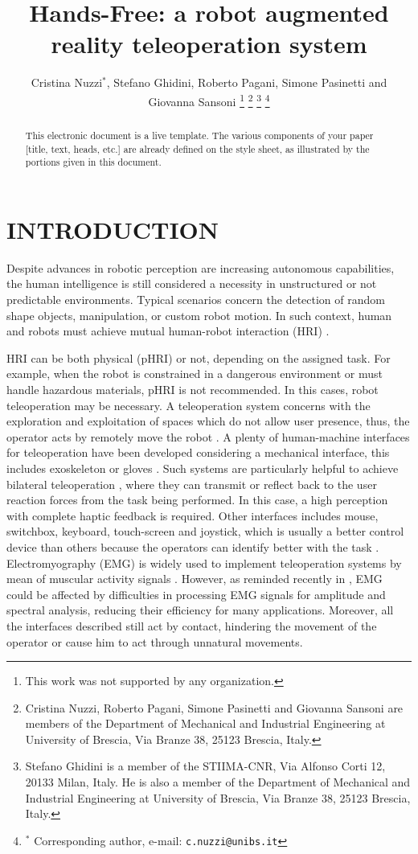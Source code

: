 \documentclass[letterpaper, 10 pt, conference]{ieeeconf}  %
\title{\LARGE \bf
Hands-Free: a robot augmented reality teleoperation system
}
\author{Cristina Nuzzi$^{*}$, Stefano Ghidini, Roberto Pagani, Simone Pasinetti and Giovanna Sansoni %
\thanks{This work was not supported by any organization.}%
\thanks{Cristina Nuzzi, Roberto Pagani, Simone Pasinetti and Giovanna Sansoni are members of the Department of Mechanical and Industrial Engineering at University of Brescia, Via Branze 38, 25123 Brescia, Italy.}
\thanks{Stefano Ghidini is a member of the STIIMA-CNR, Via Alfonso Corti 12, 20133 Milan, Italy. He is also a member of the Department of Mechanical and Industrial Engineering at University of Brescia, Via Branze 38, 25123 Brescia, Italy.}
\thanks{$^{*}$ Corresponding author, e-mail: {\tt\small c.nuzzi@unibs.it}}%
}
\begin{document}
\maketitle
\thispagestyle{empty}
\pagestyle{empty}

\begin{abstract}

This electronic document is a live template. The various components of your paper [title, text, heads, etc.] are already defined on the style sheet, as illustrated by the portions given in this document.

\end{abstract}


\section{INTRODUCTION}
Despite advances in robotic perception are increasing autonomous capabilities, the human intelligence is still considered a necessity in unstructured or not predictable environments. Typical scenarios concern the detection of random shape objects, manipulation, or custom robot motion. In such context, human and robots must achieve mutual human-robot interaction (HRI) \cite{Yanco2002}.

HRI can be both physical (pHRI) or not, depending on the assigned task. For example, when the robot is constrained in a dangerous environment or must handle hazardous materials, pHRI is not recommended. In this cases, robot teleoperation may be necessary. A teleoperation system concerns with the exploration and exploitation of spaces which do not allow user presence, thus, the operator acts by remotely move the robot \cite{VERTUTJean}. A plenty of human-machine interfaces for teleoperation have been developed considering a mechanical interface, this includes exoskeleton \cite{Rebelo2014} or gloves \cite{Lv2006}. Such systems are particularly helpful to achieve bilateral teleoperation \cite{Hokayem2006}, where they can transmit or reflect back to the user reaction forces from the task being performed. In this case, a high perception with complete haptic feedback \cite{Glover2009} is required. Other interfaces includes mouse, switchbox, keyboard, touch-screen and joystick, which is usually a better control device than others because the operators can identify better with the task \cite{Boboc2012}. Electromyography (EMG) is widely used to implement teleoperation systems by mean of muscular activity signals \cite{Vogel2011, Hassan2019}. However, as reminded recently in \cite{Roveda2018a}, EMG could be affected by difficulties in processing EMG signals for amplitude and spectral analysis, reducing their efficiency for many applications. Moreover, all the interfaces described still act by contact, hindering the movement of the operator or cause him to act through unnatural movements.
\end{document}
